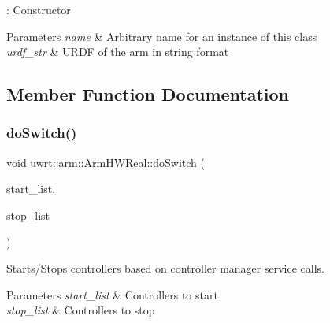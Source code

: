 \+: Constructor 


\begin{DoxyParams}{Parameters}
{\em name} & Arbitrary name for an instance of this class \\
\hline
{\em urdf\+\_\+str} & U\+R\+DF of the arm in string format \\
\hline
\end{DoxyParams}


\subsection{Member Function Documentation}
\mbox{\label{classuwrt_1_1arm_1_1_arm_h_w_real_a5bc11742cda0b7826e45a12217c89965}} 
\subsubsection{\texorpdfstring{do\+Switch()}{doSwitch()}}
{\footnotesize\ttfamily void uwrt\+::arm\+::\+Arm\+H\+W\+Real\+::do\+Switch (\begin{DoxyParamCaption}\item[{const std\+::list$<$ hardware\+\_\+interface\+::\+Controller\+Info $>$ \&}]{start\+\_\+list,  }\item[{const std\+::list$<$ hardware\+\_\+interface\+::\+Controller\+Info $>$ \&}]{stop\+\_\+list }\end{DoxyParamCaption})\hspace{0.3cm}{\ttfamily [override]}}



Starts/\+Stops controllers based on controller manager service calls. 


\begin{DoxyParams}{Parameters}
{\em start\+\_\+list} & Controllers to start \\
\hline
{\em stop\+\_\+list} & Controllers to stop \\
\hline
\end{DoxyParams}
\mbox{\label{classuwrt_1_1arm_1_1_arm_h_w_real_ab2556fef8e4666cb970113130e21a690}} 
